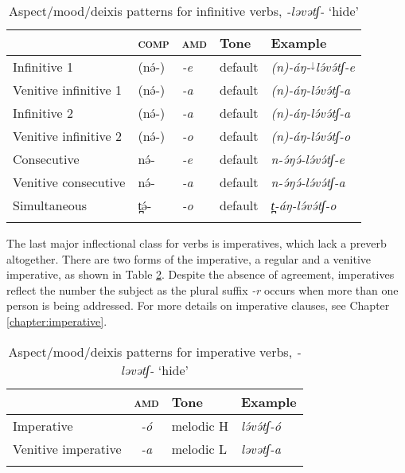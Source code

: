 \begin{table}
\begin{tabular}[t]{lllll}
\lsptoprule
						& \textsc{comp} &  \textsc{amd}  		& Tone 			& Example \\
\midrule
Infinitive 1 	& (nə́-) & \textit{-e} 	& default 	& \textit{(n)-áŋ-$^{\downarrow}$lə́və́tʃ-e}  \\
Venitive infinitive 1  	& (nə́-) & \textit{-a} 	& default 	& \textit{(n)-áŋ-\super{$\downarrow$}lə́və́tʃ-a} \\	
Infinitive 2  	& (nə́-) & \textit{-a} 	& default	& \textit{(n)-áŋ-\super{$\downarrow$}lə́və́tʃ-a} \\
Venitive infinitive 2  	& (nə́-) & \textit{-o} 	& default	& \textit{(n)-áŋ-\super{$\downarrow$}lə́və́tʃ-o} \\
Consecutive  & nə́- & \textit{-e} & default & \textit{n-ə́ŋə́-\super{$\downarrow$}lə́və́tʃ-e} \\
Venitive consecutive   & nə́- & \textit{-a} & default & \textit{n-ə́ŋə́-\super{$\downarrow$}lə́və́tʃ-a} \\
Simultaneous & t̪ə́- & \textit{-o} & default		& \textit{t̪-áŋ-\super{$\downarrow$}lə́və́tʃ-o} \\
\lspbottomrule
\end{tabular}	
\caption{Aspect/mood/deixis patterns for infinitive verbs, \textit{-ləvətʃ-} `hide'}
\label{tab:ch11:2}
\end{table}

The last major inflectional class for verbs is imperatives, which lack a preverb altogether. There are two forms of the imperative, a regular and a venitive imperative, as shown in Table \ref{tab:ch11:3}. Despite the absence of agreement, imperatives reflect the number the subject as the plural suffix \textit{-r} occurs when more than one person is being addressed. For more details on imperative clauses, see Chapter \ref{chapter:imperative}.

\begin{table}
\begin{tabular}[t]{lcll}
\lsptoprule
						&  \textsc{amd}  		& Tone 			& Example \\
\midrule
Imperative 	& \textit{-ó} & melodic H 	& \textit{lə́və́tʃ-ó} \\	
Venitive imperative 	& \textit{-a} 	& melodic L		& \textit{ləvətʃ-a} \\
\lspbottomrule
\end{tabular}	
\caption{Aspect/mood/deixis patterns for imperative verbs, \textit{-ləvətʃ-} `hide'}
\label{tab:ch11:3}
\end{table}

